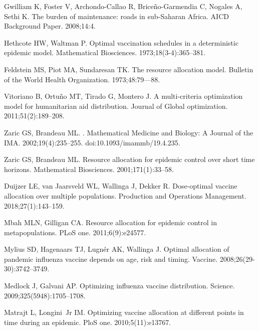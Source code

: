 \documentclass[10pt,letterpaper]{article}
\begin{document}
\begin{thebibliography}{10}

Gwilliam K, Foster V, Archondo-Callao R, Brice{\~n}o-Garmendia C, Nogales A,
  Sethi K.
\newblock The burden of maintenance: roads in sub-Saharan Africa.
\newblock AICD Background Paper. 2008;14:4.

Hethcote HW, Waltman P.
\newblock Optimal vaccination schedules in a deterministic epidemic model.
\newblock Mathematical \uppercase{B}iosciences. 1973;18(3-4):365--381.

Feldstein MS, Piot MA, Sundaresan TK.
\newblock The resource allocation model.
\newblock Bulletin of the World Health Organization. 1973;48:79–--88.

Vitoriano B, Ortu{\~n}o MT, Tirado G, Montero J.
\newblock A multi-criteria optimization model for humanitarian aid
  distribution.
\newblock Journal of Global optimization. 2011;51(2):189--208.

Zaric GS, Brandeau ML.
.
\newblock Mathematical Medicine and Biology: A Journal of the IMA.
  2002;19(4):235--255.
\newblock doi:{10.1093/imammb/19.4.235}.

Zaric GS, Brandeau ML.
\newblock Resource allocation for epidemic control over short time horizons.
\newblock Mathematical Biosciences. 2001;171(1):33--58.

Duijzer LE, van Jaarsveld WL, Wallinga J, Dekker R.
\newblock Dose-optimal vaccine allocation over multiple populations.
\newblock Production and Operations Management. 2018;27(1):143--159.

Mbah MLN, Gilligan CA.
\newblock Resource allocation for epidemic control in metapopulations.
\newblock PLoS one. 2011;6(9):e24577.

Mylius SD, Hagenaars TJ, Lugn{\'e}r AK, Wallinga J.
\newblock Optimal allocation of pandemic influenza vaccine depends on age, risk
  and timing.
\newblock Vaccine. 2008;26(29-30):3742--3749.

Medlock J, Galvani AP.
\newblock Optimizing influenza vaccine distribution.
\newblock Science. 2009;325(5948):1705--1708.

Matrajt L, Longini~Jr IM.
\newblock Optimizing vaccine allocation at different points in time during an
  epidemic.
\newblock PloS one. 2010;5(11):e13767.


\end{thebibliography}
\end{document}
